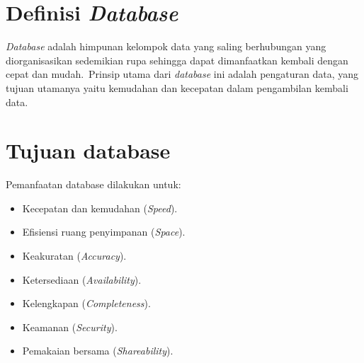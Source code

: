 \section{Definisi \textit{Database}}
\textit{Database} adalah himpunan kelompok data yang saling berhubungan yang diorganisasikan sedemikian rupa sehingga dapat dimanfaatkan kembali dengan cepat dan mudah. Prinsip utama dari \textit{database} ini adalah pengaturan data, yang tujuan utamanya yaitu kemudahan dan kecepatan dalam pengambilan kembali data.

\section{Tujuan database}
Pemanfaatan database dilakukan untuk:
\begin{itemize}
	\item Kecepatan dan kemudahan (\textit{Speed}).
	\item Efisiensi ruang penyimpanan (\textit{Space}).
	\item Keakuratan (\textit{Accuracy}).
	\item Ketersediaan (\textit{Availability}).
	\item Kelengkapan (\textit{Completeness}).
	\item Keamanan (\textit{Security}).
	\item Pemakaian bersama (\textit{Shareability}).
\end{itemize}

